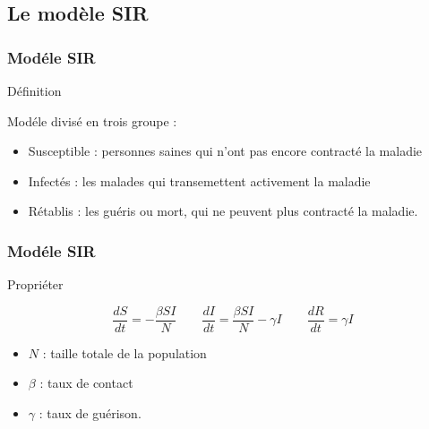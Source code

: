 \subsection{Le modèle SIR}

\begin{frame}
        \frametitle{Modéle SIR}

        \begin{block}{Définition}

                Modéle divisé en trois groupe :
                \begin{itemize}
                        \item Susceptible : personnes saines qui n'ont pas encore contracté la maladie
                        \item Infectés : les malades qui transemettent activement la maladie
                        \item Rétablis : les guéris ou mort, qui ne peuvent plus contracté la maladie.
                \end{itemize}

        \end{block}
\end{frame}

\begin{frame}
        \frametitle{Modéle SIR}

        \begin{alertblock}{Propriéter}

                $$\frac{dS}{dt} = -\frac{\beta SI}{N} \qquad \frac{dI}{dt} = \frac{\beta SI}{N} - \gamma I \qquad \frac{dR}{dt} = \gamma I$$

                \begin{itemize}
                        \item $N$ : taille totale de la population
                        \item $\beta$ : taux de contact
                        \item $\gamma$ : taux de guérison.
                \end{itemize}

        \end{alertblock}
\end{frame}
